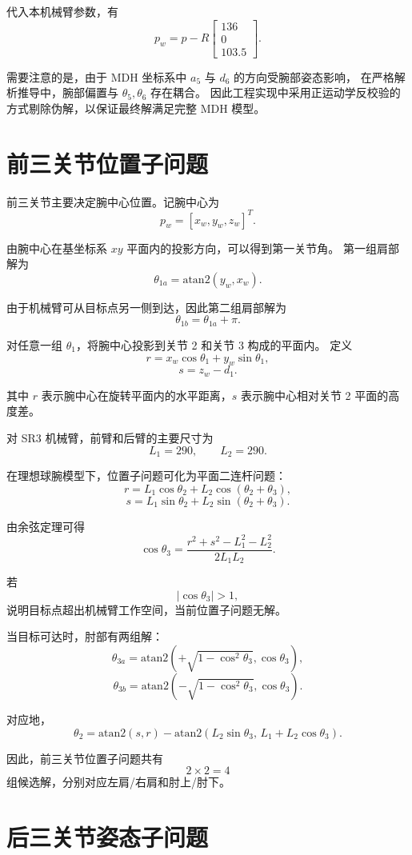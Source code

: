 \documentclass[UTF8,a4paper,12pt]{ctexart}
\begin{document}
代入本机械臂参数，有
\[
p_w
=p-R
\begin{bmatrix}
136\\0\\103.5
\end{bmatrix}.
\]

需要注意的是，由于 MDH 坐标系中 $a_5$ 与 $d_6$ 的方向受腕部姿态影响，
在严格解析推导中，腕部偏置与 $\theta_5,\theta_6$ 存在耦合。
因此工程实现中采用正运动学反校验的方式剔除伪解，以保证最终解满足完整
MDH 模型。

\section{前三关节位置子问题}

前三关节主要决定腕中心位置。记腕中心为
\[
p_w=[x_w,y_w,z_w]^T.
\]

由腕中心在基坐标系 $xy$ 平面内的投影方向，可以得到第一关节角。
第一组肩部解为
\[
\theta_{1a}=\mathrm{atan2}(y_w,x_w).
\]

由于机械臂可从目标点另一侧到达，因此第二组肩部解为
\[
\theta_{1b}=\theta_{1a}+\pi.
\]

对任意一组 $\theta_1$，将腕中心投影到关节 2 和关节 3 构成的平面内。
定义
\[
r=x_w\cos\theta_1+y_w\sin\theta_1,
\]
\[
s=z_w-d_1.
\]

其中 $r$ 表示腕中心在旋转平面内的水平距离，$s$ 表示腕中心相对关节 2
平面的高度差。

对 SR3 机械臂，前臂和后臂的主要尺寸为
\[
L_1=290,\qquad L_2=290.
\]

在理想球腕模型下，位置子问题可化为平面二连杆问题：
\[
r=L_1\cos\theta_2+L_2\cos(\theta_2+\theta_3),
\]
\[
s=L_1\sin\theta_2+L_2\sin(\theta_2+\theta_3).
\]

由余弦定理可得
\[
\cos\theta_3
=
\frac{r^2+s^2-L_1^2-L_2^2}{2L_1L_2}.
\]

若
\[
|\cos\theta_3|>1,
\]
说明目标点超出机械臂工作空间，当前位置子问题无解。

当目标可达时，肘部有两组解：
\[
\theta_{3a}=\mathrm{atan2}
\left(
+\sqrt{1-\cos^2\theta_3},\cos\theta_3
\right),
\]
\[
\theta_{3b}=\mathrm{atan2}
\left(
-\sqrt{1-\cos^2\theta_3},\cos\theta_3
\right).
\]

对应地，
\[
\theta_2
=
\mathrm{atan2}(s,r)
-
\mathrm{atan2}
\left(
L_2\sin\theta_3,\,
L_1+L_2\cos\theta_3
\right).
\]

因此，前三关节位置子问题共有
\[
2\times 2=4
\]
组候选解，分别对应左肩/右肩和肘上/肘下。

\section{后三关节姿态子问题}
\end{document}
